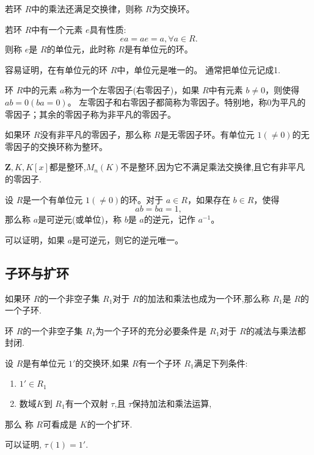 \begin{mydef}
    若环 $R$中的乘法还满足交换律，则称 $R$为交换环。
\end{mydef}
\begin{mydef}
     若环 $R$中有一个元素 $e$具有性质:
    \[ea=ae=a,\forall a \in R.\]
    则称 $e$是 $R$的单位元，此时称 $R$是有单位元的环。
\end{mydef}
容易证明，在有单位元的环 $R$中，单位元是唯一的。
    通常把单位元记成1.
\begin{mydef}
    环 $R$中的元素 $a$称为一个左零因子(右零因子)，如果 $R$中有元素 $b\neq 0$，则使得 $ab=0(ba=0)$。
    左零因子和右零因子都简称为零因子。特别地，称0为平凡的零因子；其余的零因子称为非平凡的零因子。
\end{mydef}
\begin{mydef}
    如果环 $R$没有非平凡的零因子，那么称 $R$是无零因子环。有单位元 $1(\neq 0)$的无零因子的交换环称为整环。
\end{mydef}
    $\mathbf{Z},K,K[x]$都是整环,$M_n(K)$不是整环,因为它不满足乘法交换律,且它有非平凡的零因子.
\begin{mydef}
    设 $R$是一个有单位元 $1(\neq 0)$的环。对于 $a\in R$，如果存在 $b\in R$，使得
    \[ab=ba=1,\]
    那么称 $a$是可逆元(或单位)，称 $b$是 $a$的逆元，记作 $a^{-1}$。
\end{mydef}
可以证明，如果 $a$是可逆元，则它的逆元唯一。
\subsection{子环与扩环}
\begin{mydef}[子环]
    如果环 $R$的一个非空子集 $R_1$对于 $R$的加法和乘法也成为一个环,那么称 $R_1$是 $R$的
    一个子环.
\end{mydef}
\begin{mythm}[子环判定定理]
    环 $R$的一个非空子集 $R_1$为一个子环的充分必要条件是 $R_1$对于 $R$的减法与乘法都封闭.
\end{mythm}
\begin{mydef}[扩环]
    设 $R$是有单位元 $1'$的交换环,如果 $R$有一个子环 $R_1$满足下列条件:
    \begin{enumerate}
        \item $1'\in R_1$
        \item  数域$K$到 $R_1$有一个双射 $\tau$,且 $\tau$保持加法和乘法运算,
    \end{enumerate}
    那么 称 $R$可看成是 $K$的一个扩环.
\end{mydef}
\begin{myrmk}
    可以证明, $\tau(1)=1'.$
\end{myrmk}
